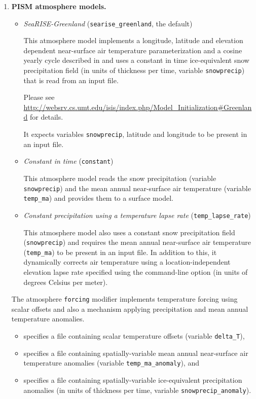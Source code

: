 \begin{enumerate}
\item \textbf{PISM atmosphere models.}
  \begin{itemize}
  \item \emph{SeaRISE-Greenland} (\verb|searise_greenland|, the default)

    This atmosphere model implements a longitude, latitude and elevation dependent near-surface air temperature parameterization and a cosine yearly cycle described in \cite{Faustoetal2009} and uses a constant in time ice-equivalent snow precipitation field (in units of thickness per time, variable \verb|snowprecip|) that is read from an input file.

    Please see \url{http://websrv.cs.umt.edu/isis/index.php/Model_Initialization#Greenland} for details.

    It expects variables \verb|snowprecip|, latitude and longitude to be present in an input file.
  \item \emph{Constant in time} (\verb|constant|)

    This atmosphere model reads the snow precipitation (variable \verb|snowprecip|) and the mean annual near-surface air temperature (variable \verb|temp_ma|) and provides them to a surface model.
  \item \emph{Constant precipitation using a temperature lapse rate} (\verb|temp_lapse_rate|)
    
    This atmosphere model also uses a constant snow precipitation field (\verb|snowprecip|) and requires the mean annual near-surface air temperature (\verb|temp_ma|) to be present in an input file. In addition to this, it dynamically corrects air temperature using a location-independent elevation lapse rate specified using the  command-line option (in units of degrees Celsius per meter).
 \end{itemize}

  The atmosphere \verb|forcing| modifier implements temperature forcing using scalar offsets and also a mechanism applying precipitation and mean annual temperature anomalies.
  \begin{itemize}
  \item {} specifies a file containing scalar temperature offsets (variable \verb|delta_T|), 
  \item {} specifies a file containing spatially-variable mean annual near-surface air temperature anomalies (variable \verb|temp_ma_anomaly|), and
  \item {} specifies a file containing spatially-variable ice-equivalent precipitation anomalies (in units of thickness per time, variable \verb|snowprecip_anomaly|).
  \end{itemize}


\end{enumerate}

